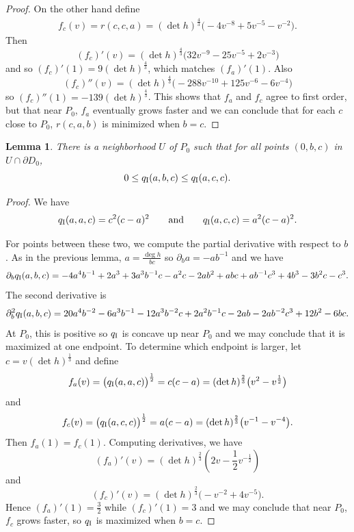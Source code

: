 \documentclass[pdftex]{sigma}
\numberwithin{equation}{section}
\newtheorem{Lemma}[Theorem]{Lemma}
\newcommand{\dvar}[1]{\partial_{#1}} %
\begin{document}
\begin{proof}
On the other hand define
\begin{gather*}
f_c(v) = r(c, c, a) = (\det h)^{\frac{4}{3}}\big({-}4 v^{-8} + 5 v^{-5} - v^{-2}\big).
\end{gather*}
Then
\[
(f_c)'(v) = (\det h)^{\frac{4}{3}}\big(32 v^{-9} - 25 v^{-5} + 2 v^{-3}\big)
\]
and so $(f_c)'(1) = 9(\det h)^{\frac{4}{3}}$, which matches $(f_a)'(1)$. Also
\[
(f_c)''(v) = (\det h)^{\frac{4}{3}}\big({-}288 v^{-10} + 125 v^{-6} - 6 v^{-4}\big)
\]
so $(f_c)''(1) = -139 (\det h)^{\frac{4}{3}}$. This shows that $f_a$ and $f_c$ agree to first order, but that near $P_0$, $f_a$ eventually grows faster and we can conclude that for each $c$ close to $P_0$, $r(c, a, b)$ is minimized when $b = c$.
\end{proof}

\begin{Lemma} \label{s3abcequalplemma}
There is a neighborhood $U$ of $P_0$ such that for all points $(0, b, c)$ in $U \cap \partial D_0$,
\[
0 \leq q_{\rm I}(a, b, c) \leq q_{\rm I}(a, c, c).
\]
\end{Lemma}

\begin{proof}
We have
\[
q_{\rm I}(a, a, c) = c^2(c - a)^2
\qquad \text{and} \qquad
q_{\rm I}(a, c, c) = a^2(c - a)^2.
\]

For points between these two, we compute the partial derivative with respect to $b$. As in the previous lemma, $a = \frac{\deg h}{bc}$ so $\dvar{b} a = -a b^{-1}$ and we have
\begin{gather*}
\dvar{b} q_{\rm I}(a, b, c) = -4a^4 b^{-1} + 2a^3 + 3a^3 b^{-1} c - a^2 c
			 - 2ab^2 + abc + ab^{-1} c^3 + 4b^3 - 3b^2c - c^3.
\end{gather*}
The second derivative is
\begin{gather*}
\dvar{b}^2 q_{\rm I}(a, b, c) = 20a^4 b^{-2} - 6a^3 b^{-1} - 12 a^3 b^{-2} c + 2a^2 b^{-1} c
		 - 2ab - 2ab^{-2} c^3 + 12 b^2 - 6bc.
\end{gather*}
At $P_0$, this is positive so $q_{\rm I}$ is concave up near $P_0$ and we may conclude that it is maximized at one endpoint. To determine which endpoint is larger, let $c = v (\det h)^{\frac{1}{3}}$ and define
\[
f_a(v) = \bigl(q_{\rm I}(a, a, c)\bigr)^{\frac{1}{2}} = c(c - a) = (\det h)^{\frac{2}{3}} \big(v^2 - v^{\frac{1}{2}}\big)
\]
and
\[
f_c(v) = \bigl(q_{\rm I}(a, c, c)\bigr)^{\frac{1}{2}} = a(c - a) = (\det h)^{\frac{2}{3}} \big(v^{-1} - v^{-4}\big).
\]
Then $f_a(1) = f_c(1)$. Computing derivatives, we have
\[
(f_a)'(v) = (\det h)^{\frac{2}{3}} \left(2v - \frac{1}{2} v^{-\frac{1}{2}}\right)
\]
and
\[
(f_c)'(v) = (\det h)^{\frac{2}{3}} \big({-}v^{-2} + 4v^{-5}\big).
\]
Hence $(f_a)'(1) = \frac{3}{2}$ while $(f_c)'(1) = 3$ and we may conclude that near $P_0$, $f_c$ grows faster, so $q_{\rm I}$ is maximized when $b = c$.
\end{proof}
\end{document}
